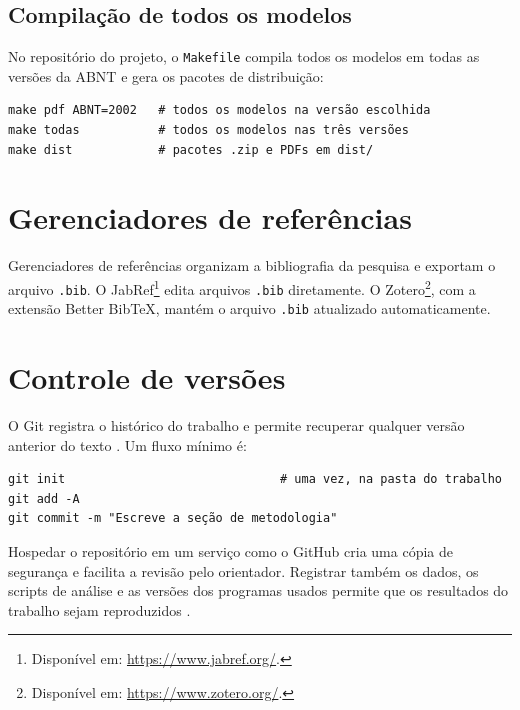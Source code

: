 \subsection{Compilação de todos os modelos}

No repositório do projeto, o \texttt{Makefile} compila todos os modelos em todas as versões da ABNT e gera os pacotes de distribuição:

\begin{verbatim}
make pdf ABNT=2002   # todos os modelos na versão escolhida
make todas           # todos os modelos nas três versões
make dist            # pacotes .zip e PDFs em dist/
\end{verbatim}

\section{Gerenciadores de referências}\label{sec:gerenciadores}

Gerenciadores de referências organizam a bibliografia da pesquisa e exportam o arquivo \texttt{.bib}. O JabRef\footnote{Disponível em: \url{https://www.jabref.org/}.} edita arquivos \texttt{.bib} diretamente. O Zotero\footnote{Disponível em: \url{https://www.zotero.org/}.}, com a extensão Better Bib\TeX, mantém o arquivo \texttt{.bib} atualizado automaticamente.

\section{Controle de versões}\label{sec:git}

O Git registra o histórico do trabalho e permite recuperar qualquer versão anterior do texto \cite{chacon2014}. Um fluxo mínimo é:

\begin{verbatim}
git init                              # uma vez, na pasta do trabalho
git add -A
git commit -m "Escreve a seção de metodologia"
\end{verbatim}

Hospedar o repositório em um serviço como o GitHub cria uma cópia de segurança e facilita a revisão pelo orientador. Registrar também os dados, os scripts de análise e as versões dos programas usados permite que os resultados do trabalho sejam reproduzidos \cite{sandve2013}.
